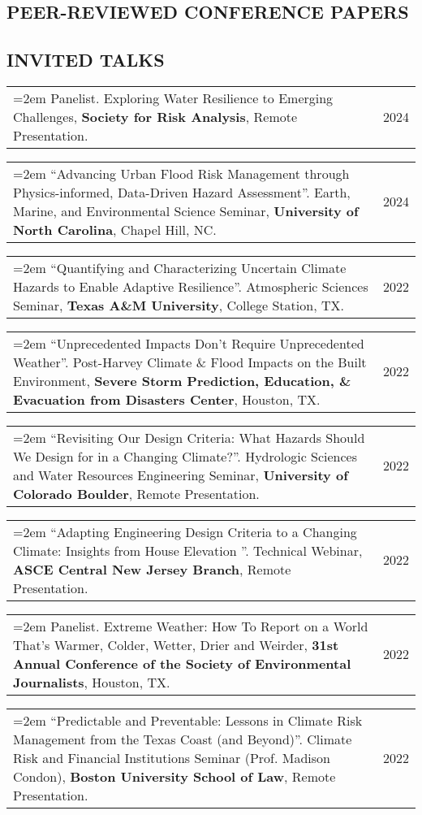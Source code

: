 \documentclass[10pt,oneside]{article}
\makeatletter
\newenvironment{alignedentrieshang}[1][2em]{%
  \noindent%
}{%
}
\newcommand{\hangingitem}[2]{%
  \noindent%
  \begin{tabular*}{\textwidth}{@{}p{0.85\textwidth}@{\extracolsep{\fill}}r@{}}%
    \hangindent=2em \hangafter=1 #1 & #2%
  \end{tabular*}%
}
\makeatother
\begin{document}
\subsection{PEER-REVIEWED CONFERENCE PAPERS}

\printbibliography[heading=none, type=inproceedings, env=hanging]

\subsection{INVITED TALKS}

\begin{alignedentrieshang}

\hangingitem{Panelist. Exploring Water Resilience to Emerging Challenges,  \textbf{Society for Risk Analysis}, Remote Presentation.}{2024}

\hangingitem{\enquote{Advancing Urban Flood Risk Management through Physics-informed, Data-Driven Hazard Assessment}. Earth, Marine, and Environmental Science Seminar,  \textbf{University of North Carolina}, Chapel Hill, NC.}{2024}

\hangingitem{\enquote{Quantifying and Characterizing Uncertain Climate Hazards to Enable Adaptive Resilience}. Atmospheric Sciences Seminar,  \textbf{Texas A\&M University}, College Station, TX.}{2022}

\hangingitem{\enquote{Unprecedented Impacts Don't Require Unprecedented Weather}. Post-Harvey Climate \& Flood Impacts on the Built Environment,  \textbf{Severe Storm Prediction, Education, \& Evacuation from Disasters Center}, Houston, TX.}{2022}

\hangingitem{\enquote{Revisiting Our Design Criteria: What Hazards Should We Design for in a Changing Climate?}. Hydrologic Sciences and Water Resources Engineering Seminar,  \textbf{University of Colorado Boulder}, Remote Presentation.}{2022}

\hangingitem{\enquote{Adapting Engineering Design Criteria to a Changing Climate: Insights from House Elevation }. Technical Webinar,  \textbf{ASCE Central New Jersey Branch}, Remote Presentation.}{2022}

\hangingitem{Panelist. Extreme Weather: How To Report on a World That's Warmer, Colder, Wetter, Drier and Weirder,  \textbf{31st Annual Conference of the Society of Environmental Journalists}, Houston, TX.}{2022}

\hangingitem{\enquote{Predictable and Preventable: Lessons in Climate Risk Management from the Texas Coast (and Beyond)}. Climate Risk and Financial Institutions Seminar (Prof. Madison Condon),  \textbf{Boston University School of Law}, Remote Presentation.}{2022}


\end{alignedentrieshang}
\end{document}
